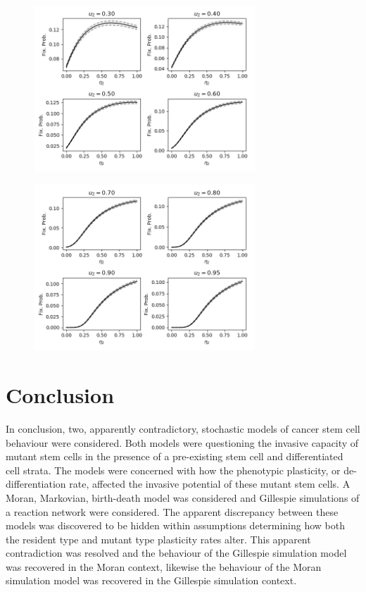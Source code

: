 \documentclass[12pt]{article}
\begin{document}
\begin{figure}[!ht]
\begin{center}
\includegraphics[width=0.74\textwidth]{avg_eta1_u2_stackplot2.png}
\end{center}
\caption{}\label{u2_stack2}
\end{figure}

\begin{figure}[!ht]
\begin{center}
\includegraphics[width=0.74\textwidth]{avg_eta1_u2_stackplot3.png}
\end{center}
\caption{}\label{u2_stack3}
\end{figure}


\section{Conclusion}
In conclusion, two, apparently contradictory, stochastic models of cancer stem cell behaviour were considered. Both models were questioning the invasive capacity of mutant stem cells in the presence of a pre-existing stem cell and differentiated cell strata. The models were concerned with how the phenotypic plasticity, or de-differentiation rate, affected the invasive potential of these mutant stem cells. A Moran, Markovian, birth-death model was considered and Gillespie simulations of a reaction network were considered. The apparent discrepancy between these models was discovered to be hidden within assumptions determining how both the resident type and mutant type plasticity rates alter. This apparent contradiction was resolved and the behaviour of the Gillespie simulation model was recovered in the Moran context, likewise the behaviour of the Moran simulation model was recovered in the Gillespie simulation context.
\end{document}
